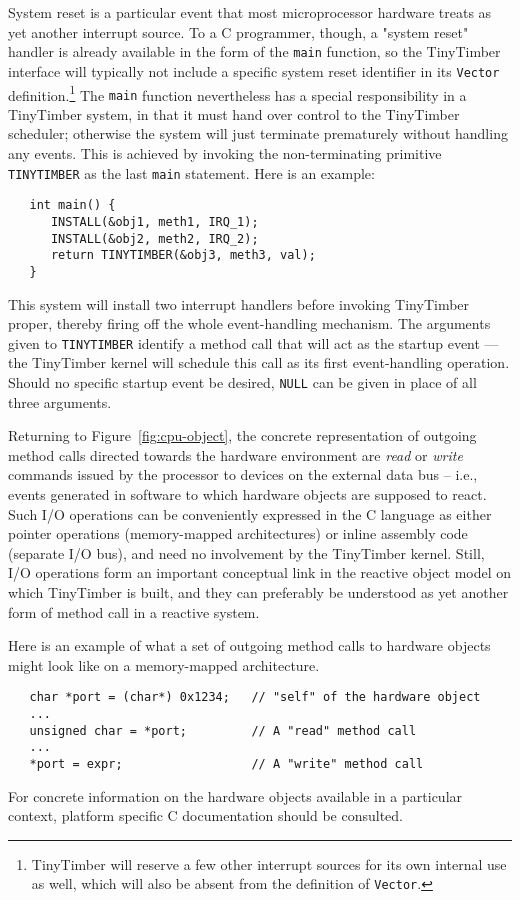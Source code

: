 \documentclass[12pt]{article}
\begin{document}
System reset is a particular event that most microprocessor hardware treats as yet another interrupt source. To a C programmer, though, a "system reset" handler is already available in the form of the {\tt main} function, so the TinyTimber interface will typically not include a specific system reset identifier in its {\tt Vector} definition.\footnote{TinyTimber will reserve a few other interrupt sources for its own internal use as well, which will also be absent from the definition of {\tt Vector}.} The {\tt main} function nevertheless has a special responsibility in a TinyTimber system, in that it must hand over control to the TinyTimber scheduler; otherwise the system will just terminate prematurely without handling any events. This is achieved by invoking the non-terminating primitive {\tt TINYTIMBER} as the last {\tt main} statement. Here is an example:
\begin{verbatim}
   int main() {
      INSTALL(&obj1, meth1, IRQ_1);
      INSTALL(&obj2, meth2, IRQ_2);
      return TINYTIMBER(&obj3, meth3, val);
   }
\end{verbatim}
This system will install two interrupt handlers before invoking TinyTimber proper, thereby firing off the whole event-handling mechanism. The arguments given to {\tt TINYTIMBER} identify a method call that will act as the startup event --- the TinyTimber kernel will schedule this  call as its first event-handling operation. Should no specific startup event be desired, {\tt NULL} can be given in place of all three arguments.

Returning to Figure~\ref{fig:cpu-object}, the concrete representation of outgoing method calls directed towards the hardware environment are {\em read} or {\em write} commands issued by the processor to devices on the external data bus -- i.e., events generated in software to which hardware objects are supposed to react.  Such I/O operations can be conveniently expressed in the C language as either pointer operations (memory-mapped architectures) or inline assembly code (separate I/O bus), and need no involvement by the TinyTimber kernel.  Still, I/O operations form an important conceptual link in the reactive object model on which TinyTimber is built, and they can preferably be understood as yet another form of method call in a reactive system.

Here is an example of what a set of outgoing method calls to hardware objects might look like on a memory-mapped architecture.
\begin{verbatim}
   char *port = (char*) 0x1234;   // "self" of the hardware object
   ...
   unsigned char = *port;         // A "read" method call
   ...
   *port = expr;                  // A "write" method call
\end{verbatim}
For concrete information on the hardware objects available in a particular context, platform specific C documentation should be consulted.
\end{document}
